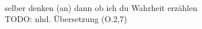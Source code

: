 \begin{exe}
\ex \label{ex:O17317} \gll {}          \\
{selber} {denken (an)} {dann } {} {ob} {ich} {du} {Wahrheit} {erzählen} {}\\
\glt TODO: nhd. Übersetzung (O.2,7)
\end{exe}
